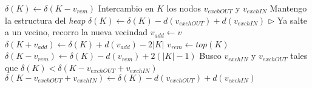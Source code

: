 \begin{pseudocodigo}
                \State $\delta(K) \gets \delta(K-v_{rem})$ 
                \Statex
            \Else
                \State Intercambio en $K$ los nodos $v_{exchOUT}$ y $v_{exchIN}$ 
                \State Mantengo la estructura del \emph{heap} 
                \State $\delta(K) \gets \delta(K) - d(v_{exchOUT}) + d(v_{exchIN})$ 
            \EndIf {}
            \Statex
            \Statex $\triangleright$ Ya salte a un vecino, recorro la nueva vecindad
             
                \State $v_{add} \gets v$ 
                \State $\delta(K+v_{add}) \gets \delta(K) + d(v_{add}) - 2|K|$ 
            \EndIf {}
            \Statex
            \State $v_{rem} \gets top(K)$ 
            \State $\delta(K-v_{rem}) \gets \delta(K)-d(v_{rem})+2(|K|-1)$ 
            \Statex
            \State Busco $v_{exchIN}$ y $v_{exchOUT}$ tales que $\delta(K) < \delta(K-v_{exchOUT}+v_{exchIN})$ 
            \State $\delta(K-v_{exchOUT}+v_{exchIN}) \gets \delta(K) - d(v_{exchOUT}) + d(v_{exchIN})$ 
            \Statex
        \EndWhile {}
    \EndIf {}
    \State {} 
    \Statex
    \Statex {}
\end{pseudocodigo}

\bigskip

